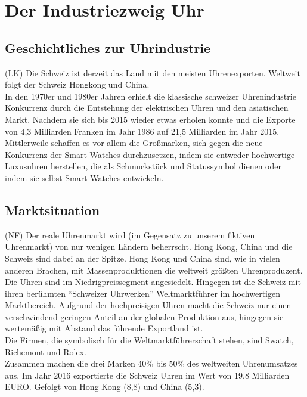 \clearpage
\chapter{Der Industriezweig Uhr}
\section{Geschichtliches zur Uhrindustrie}
(LK) Die Schweiz ist derzeit das Land mit den meisten Uhrenexporten. Weltweit folgt der Schweiz Hongkong und China.\\ 
In den 1970er und 1980er Jahren erhielt die klassische schweizer Uhrenindustrie Konkurrenz durch die Entstehung der elektrischen Uhren und den asiatischen Markt. Nachdem sie sich bis 2015 wieder etwas erholen konnte und die Exporte von 4,3 Milliarden Franken im Jahr 1986 auf 21,5 Milliarden im Jahr 2015.\\ 
Mittlerweile schaffen es vor allem die Großmarken, sich gegen die neue Konkurrenz der Smart Watches durchzusetzen, indem sie entweder hochwertige Luxusuhren herstellen, die als Schmuckstück und Statussymbol dienen oder indem sie selbst Smart Watches entwickeln.

\section{Marktsituation}
(NF) Der reale Uhrenmarkt wird (im Gegensatz zu unserem fiktiven Uhrenmarkt) von nur wenigen Ländern beherrscht. Hong Kong, China und die Schweiz sind dabei an der Spitze. Hong Kong und China sind, wie in vielen anderen Brachen, mit Massenproduktionen die weltweit größten Uhrenproduzent. Die Uhren sind im Niedrigpreissegment angesiedelt. Hingegen ist die Schweiz mit ihren berühmten \enquote{Schweizer Uhrwerken} Weltmarktführer im hochwertigen Marktbereich. Aufgrund der hochpreisigen Uhren macht die Schweiz nur einen verschwindend geringen Anteil an der globalen Produktion aus, hingegen sie wertemäßig mit Abstand das führende Exportland ist. \\   
Die Firmen, die symbolisch für die Weltmarktführerschaft stehen, sind Swatch, Richemont und Rolex.\\
Zusammen machen die drei Marken 40\% bis 50\% des weltweiten Uhrenumsatzes aus. Im Jahr 2016 exportierte die Schweiz Uhren im Wert von 19,8 Milliarden EURO. Gefolgt von Hong Kong (8,8) und China (5,3).


